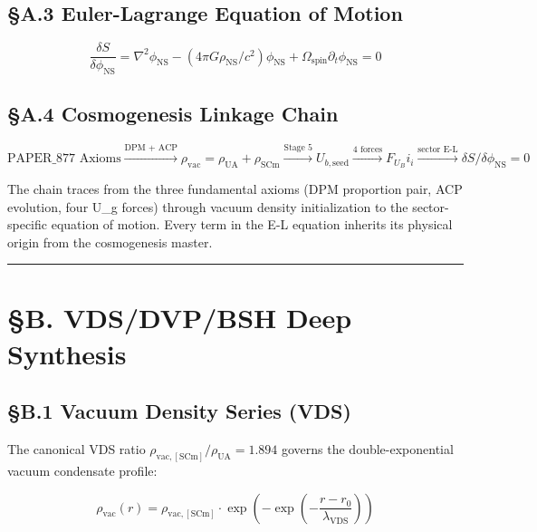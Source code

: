\documentclass[12pt,a4paper]{article}
\begin{document}
\subsection{\S{}A.3 Euler-Lagrange Equation of Motion}

\begin{equation}
\boxed{\frac{\delta S}{\delta \phi_{\mathrm{NS}}} = \nabla^2 \phi_{\mathrm{NS}} - (4\pi G \rho_{\mathrm{NS}}/c^2)\phi_{\mathrm{NS}} + \Omega_{\mathrm{spin}} \partial_t \phi_{\mathrm{NS}} = 0}
\end{equation}

\subsection{\S{}A.4 Cosmogenesis Linkage Chain}

\begin{equation}
\text{PAPER\_877 Axioms} \xrightarrow{\text{DPM + ACP}} \rho_{\mathrm{vac}} = \rho_{\mathrm{UA}} + \rho_{\mathrm{SCm}} \xrightarrow{\text{Stage 5}} U_{b,\mathrm{seed}} \xrightarrow{\text{4 forces}} F_U_Bi_i \xrightarrow{\text{sector E-L}} \delta S/\delta \phi_{\mathrm{NS}} = 0
\end{equation}

The chain traces from the three fundamental axioms (DPM proportion pair, ACP evolution, four U\_g forces) through vacuum density initialization to the sector-specific equation of motion. Every term in the E-L equation inherits its physical origin from the cosmogenesis master.

\medskip\hrule\medskip

\section{\S{}B. VDS/DVP/BSH Deep Synthesis}

\subsection{\S{}B.1 Vacuum Density Series (VDS)}

The canonical VDS ratio $\rho_{\mathrm{vac,[SCm]}} / \rho_{\mathrm{UA}} = 1.894$ governs the double-exponential vacuum condensate profile:

\begin{equation}
\rho_{\mathrm{vac}}(r) = \rho_{\mathrm{vac,[SCm]}} \cdot \exp\!\left(-\exp\!\left(-\frac{r - r_0}{\lambda_{\mathrm{VDS}}}\right)\right)
\end{equation}
\end{document}
